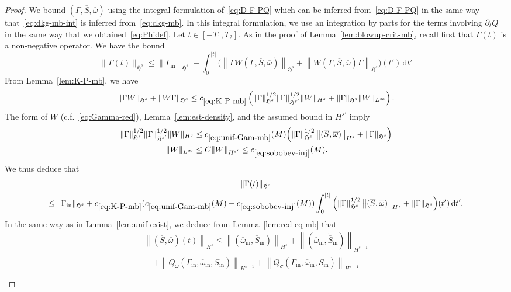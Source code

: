 \documentclass[AHL,Unicode,longabstracts,published]{cedram}
\newcommand{\rmin}{\mathrm{in}}
\renewcommand\bar{\overline}
\newcommand{\gH}{\mathfrak{H}}
\newcommand\ii{{\ensuremath {\infty}}}
\renewcommand\d[1]{{\ensuremath{\,\text{d}#1}}}
\begin{document}
\begin{proof}
We bound $(\Gamma,\bar{S},\bar{\omega})$ using the integral formulation of~\eqref{eq:D-F-PQ} which can be inferred from~\eqref{eq:D-F-PQ} in the same way that~\eqref{eq:dkg-mb-int} is inferred from~\eqref{eq:dkg-mb}. In this integral formulation, we use an integration by parts for the terms involving $\partial_t Q$ in the same way that we obtained~\eqref{eq:Phidef}. Let $t\in[-T_1,T_2]$. As in the proof of Lemma~\ref{lem:blowup-crit-mb}, recall first that $\Gamma(t)$ is a non-negative operator. We have the bound
\[
\|\Gamma(t)\|_{\gH^s} \leq
\|\Gamma_\rmin\|_{\gH^s} + \int_0^{|t|} \Big(\left\|\Gamma W(\Gamma, \overline{S}, \overline{\omega})\right\|_{\gH^s} +\left\|W(\Gamma, \overline{S}, \overline{\omega}) \Gamma \right\|_{\gH^s}\Big)(t') \d t'
\]
From Lemma~\ref{lem:K-P-mb}, we have
\[
\|\Gamma W \|_{\gH^s} +\|W \Gamma \|_{\gH^s}\leq c_{\eqref{eq:K-P-mb}} \left(\|\Gamma\|_{\gH^s}^{1/2}\|\Gamma\|_{\gH^{s'}}^{1/2} \|W\|_{H^s} + \|\Gamma\|_{\gH^s} \|W\|_{L^\infty} \right).
\]
The form of $W$ (c.f.~\eqref{eq:Gamma-red}), Lemma~\ref{lem:est-density}, and the assumed bound in $H^{s'}$ imply
\begin{align}\label{eq:unif-Gam-mb}
\|\Gamma\|_{\gH^s}^{1/2}\|\Gamma\|_{\gH^{s'}}^{1/2} \|W\|_{H^s} &\leq c_{\eqref{eq:unif-Gam-mb}}(M)\Big(\|\Gamma\|_{\gH^s}^{1/2}\left\|(\overline{S}, \overline{\omega})\right\|_{H^s} + \|\Gamma\|_{\gH^s}\Big) \\
\|W\|_{L^\ii}&\leq C\|W\|_{H^{s'}}\leq c_{\eqref{eq:sobobev-inj}}(M). \label{eq:sobobev-inj}
\end{align}
We thus deduce that
\begin{multline*}
\|\Gamma(t)\|_{\gH^s} \\
\leq
\|\Gamma_\rmin\|_{\gH^s} + c_{\eqref{eq:K-P-mb}}(c_{\eqref{eq:unif-Gam-mb}}(M)+c_{\eqref{eq:sobobev-inj}}(M))\int_0^{|t|} \Big(\|\Gamma\|_{\gH^s}^{1/2}\left\|(\overline{S}, \overline{\omega})\right\|_{H^s} + \|\Gamma\|_{\gH^s} \Big)(t') \d t'.
\end{multline*}
In the same way as in Lemma~\ref{lem:unif-exist}, we deduce from Lemma~\ref{lem:red-eq-mb} that
\begin{multline}
\left\|(\bar{S},\bar{\omega})(t)\right\|_{H^s} \leq
\left\|(\overline{\omega}_\rmin, \overline{S}_\rmin)\right\|_{H^s} + \left\|(\dot{\overline{\omega}}_\rmin, \dot{\overline{S}}_\rmin)\right\|_{H^{s-1}} \\
\begin{aligned}
&+\left\|Q_\omega(\Gamma_\rmin, \overline{\omega}_\rmin, \overline{S}_\rmin)\right\|_{H^{s-1}} + \left\|Q_\sigma(\Gamma_\rmin, \overline{\omega}_\rmin, \overline{S}_\rmin)\right\|_{H^{s-1}} \\

\end{aligned}
\end{multline}
\end{proof}
\end{document}
